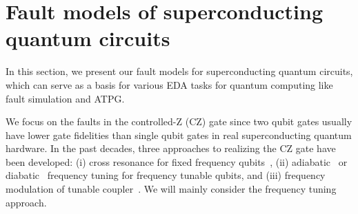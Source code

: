 \documentclass[conference, 9pt]{IEEEtran}
\begin{document}
\section{Fault models of superconducting quantum circuits}

In this section, we present our fault models for superconducting quantum circuits, which can serve as a basis for various EDA tasks for quantum computing like fault simulation and ATPG. 

We focus on the faults in the controlled-Z (CZ) gate since two qubit gates usually have lower gate fidelities than single qubit gates in real superconducting quantum hardware. In the past decades, three approaches to realizing the CZ gate have been developed: (i) cross resonance for fixed frequency qubits~\cite{PhysRevB.81.134507,Allen_2017,Tripathi_2019}, (ii) adiabatic~\cite{PhysRevApplied.11.034030,DiCarlo_2009,PhysRevA.87.022309,Martinis_2014}
 or diabatic~\cite{barends2019diabatic} frequency tuning for frequency tunable qubits, and (iii) frequency modulation of tunable coupler~\cite{PhysRevA.97.022330, PhysRevB.87.220505,PhysRevApplied.10.034050}. %
We will mainly consider the frequency tuning approach. 
\end{document}
